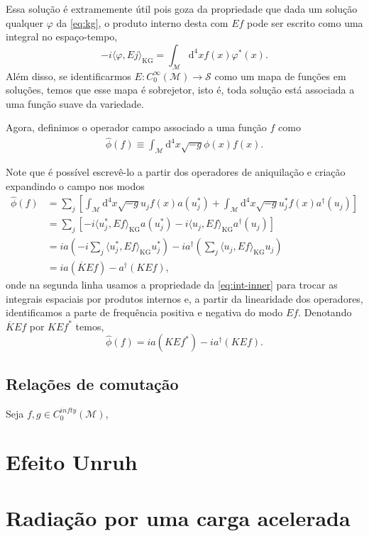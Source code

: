 \documentclass[12pt]{article}
\newcommand{\m}{\mathcal{M}}
\newcommand{\s}{\mathcal{S}}
\newcommand{\dd}{\mathrm{d}}
\newcommand{\innerkg}[2]{\langle#1,#2\rangle_{\text{KG}}}
\begin{document}
Essa solução é extramemente útil pois goza da propriedade que dada um solução qualquer \(\varphi\) da \cref{eq:kg}, o produto interno desta com \(Ef\) pode ser escrito como uma integral no espaço-tempo,
\begin{equation}
    -i\innerkg{\varphi}{Ej}=\int_\m\dd^4xf(x)\varphi^*(x).
    \label{eq:int-inner}
\end{equation}
Além disso, se identificarmos \(E:C_0^{\infty}(\m)\to\s\) como um mapa de funções em soluções, temos que esse mapa é sobrejetor, isto é, toda solução está associada a uma função suave da variedade.

Agora, definimos o operador campo associado a uma função \(f\) como
\begin{subequations}
    \begin{align}
        \hat{\phi}(f)\equiv\int_\m\dd^4x\sqrt{-g}\phi(x)f(x).
    \end{align}
\end{subequations}

Note que é possível escrevê-lo a partir dos operadores de aniquilação e criação expandindo o campo nos modos
\begin{subequations}
    \begin{align}
        \hat{\phi}(f)&=\sum_j\left[\int_\m\dd^4x\sqrt{-g}u_jf(x)a(u_j^*)+\int_\m\dd^4x\sqrt{-g}u_j^*f(x)a^{\dagger}(u_j)\right]\\
        &=\sum_j\left[-i\innerkg{u_j^*}{Ef}a(u_j^*)-i\innerkg{u_j}{Ef}a^\dagger(u_j)\right]\\
        &=ia\left(-i\sum_j\innerkg{u_j^*}{Ef}u^*_j\right)-ia^\dagger\left(\sum_j\innerkg{u_j}{Ef}u_j\right)\\
        &=ia\left(\overline{K}Ef\right)-a^\dagger\left(KEf\right),
    \end{align}
\end{subequations}
onde na segunda linha usamos a propriedade da \cref{eq:int-inner} para trocar as integrais espaciais por produtos internos e, a partir da linearidade dos operadores, identificamos a parte de frequência positiva e negativa do modo \(Ef\). Denotando \(\overline{K}Ef\) por \(KEf^*\) temos,
\begin{equation}
    \hat{\phi}(f)=ia\left(KEf^*\right)-ia^\dagger\left(KEf\right).
\end{equation}

\subsection*{Relações de comutação}
Seja \(f,g\in C_0^{infty}(\m)\), 


\section{Efeito Unruh}

\section{Radiação por uma carga acelerada}
\end{document}
